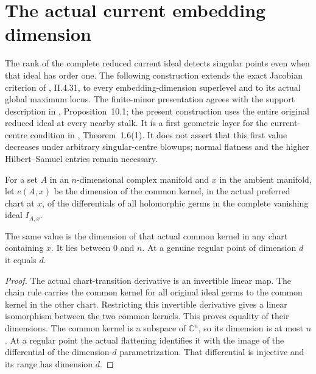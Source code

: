 \section{The actual current embedding dimension}
\label{sec:hironaka-current-embedding-dimension}

The rank of the complete reduced current ideal detects singular points
even when that ideal has order one. The following construction extends
the exact Jacobian criterion of \cite{demailly-cadg}, II.4.31, to every
embedding-dimension superlevel and to its actual global maximum locus.
The finite-minor presentation agrees with the support description in
\cite{bierstone-milman97-invent-math}, Proposition~10.1; the present
construction uses the entire original reduced ideal at every nearby stalk.
It is a first geometric layer for the current-centre condition in
\cite{bierstone-milman97-invent-math}, Theorem~1.6(1). It does not assert
that this first value decreases under arbitrary singular-centre blowups;
normal flatness and the higher Hilbert--Samuel entries remain necessary.

\begin{definition}
\label{hir:current-embedding-dimension}
\leanok
{}
For a set $A$ in an $n$-dimensional complex manifold and $x$ in the
ambient manifold, let $e(A,x)$ be the dimension of the common kernel,
in the actual preferred chart at $x$, of the differentials of all
holomorphic germs in the complete vanishing ideal $I_{A,x}$.
\end{definition}

\begin{lemma}
\label{hir:embedding-dimension-chart-independent}
\leanok
{}
The same value is the dimension of that actual common kernel in any
chart containing $x$. It lies between $0$ and $n$. At a genuine regular
point of dimension $d$ it equals $d$.
\end{lemma}
\begin{proof}
The actual chart-transition derivative is an invertible linear map.
The chain rule carries the common kernel for all original ideal germs
to the common kernel in the other chart. Restricting this invertible derivative gives a linear isomorphism
between the two common kernels. This proves equality of their dimensions. The common kernel
is a subspace of $\mathbb C^n$, so its dimension is at most $n$.
At a regular point the actual flattening identifies it with the image
of the differential of the dimension-$d$ parametrization. That
differential is injective and its range has dimension $d$.
\end{proof}

